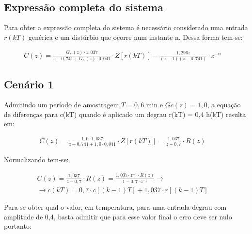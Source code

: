 \documentclass[a4paper,12pt]{article}
\begin{document}
		\subsection{Expressão completa do sistema}
			Para obter a expressão completa do sistema é necessário considerado uma entrada $r(kT)$ genérica e um distúrbio que ocorre num instante n. Dessa forma tem-se:
			
			\begin{equation}
				\left.
				\begin{array}{c}
					\displaystyle C(z) = \frac{G_C(z) \cdot 1,037}{z - 0,741 + G_C(z) \cdot 0,041} \cdot Z\left[r(kT)\right] - \frac{1,296z}{(z-1)(z-0,741)} \cdot z^{-n}
				\end{array}
				\right.
				\quad 
			\end{equation}
	
		\subsection{Cenário 1}
		
			Admitindo um período de amostragem $T = 0,6$ min e $Gc(z) = 1,0$, a equação de diferenças para c(kT) quando é aplicado um degrau r(kT) = 0,4 h(kT) resulta em:
			
			\begin{equation}
				\left.
				\begin{array}{c}
					\displaystyle C(z) = \frac{1,0 \cdot 1,037}{z - 0,741 + 1,0 \cdot 0,041} \cdot Z\left[r(kT)\right] = \frac{1,037}{z - 0,7} \cdot R(z)
				\end{array}
				\right.
				\quad 
			\end{equation}
			
			Normalizando tem-se:
			
			\begin{equation}
				\left.
				\begin{array}{c}
					\displaystyle C(z) = \frac{1,037}{z - 0,7} \cdot R(z) = \frac{1,037 \cdot z^{-1} \cdot R(z)}{1 - 0,7 \cdot z^{-1}}  \rightarrow \\[20pt]
					\rightarrow \displaystyle c(kT) = 0,7\cdot c[(k-1)T] + 1,037 \cdot r[(k-1)T]
				\end{array}
				\right.
				\quad 
			\end{equation}
			
			Para se obter qual o valor, em temperatura, para uma entrada degrau com amplitude de 0,4, basta admitir que para esse valor final o erro deve ser nulo portanto:
			
\end{document}
